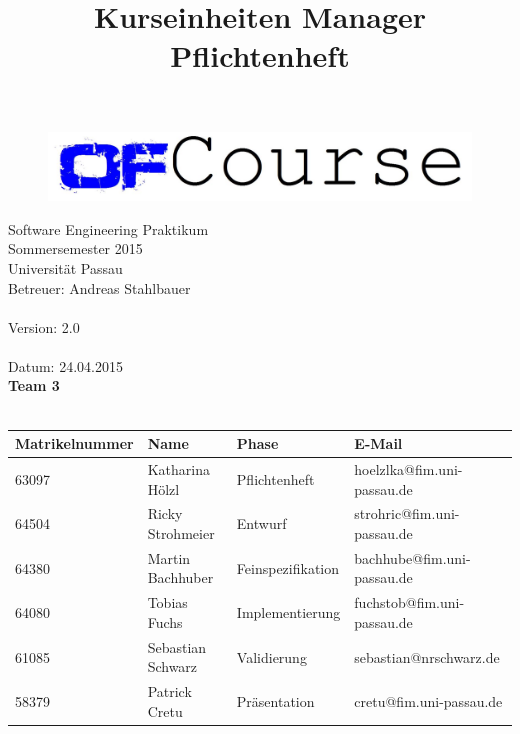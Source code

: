 \documentclass[a4paper]{scrreprt}
\begin{document}
	\thispagestyle{plain}

\begin{titlepage}
    \begin{center}
\begin{figure}[th]
\centering
\includegraphics[width=0.6\linewidth]{logo/name_blau_ofCourse.jpg}
\end{figure}

    	\begin{title}
        	\title{\Huge{\textbf{Kurseinheiten Manager \\ Pflichtenheft\\}}}

		\end{title}
		\hspace{3cm}

        	Software Engineering Praktikum \\
        	Sommersemester 2015\\
        	Universität Passau\\


        	Betreuer: Andreas Stahlbauer\\
        	\hspace{1,5cm}\\
        	Version: 2.0 \\
        	\hspace{1,5cm}\\
        	Datum: 24.04.2015\\[50pt]
        	\textbf{Team 3} \\
            \ \\
    
        
        
        \begin{tabular}{ | l | l | l | l |}
            \hline
            \textbf{Matrikelnummer} & \textbf{Name} & \textbf{Phase} & \textbf{E-Mail}  \\ \hline
            63097 & Katharina Hölzl & Pflichtenheft & hoelzlka@fim.uni-passau.de \\ \hline
            64504 & Ricky Strohmeier& Entwurf & strohric@fim.uni-passau.de  \\ \hline
            64380 & Martin Bachhuber & Feinspezifikation  & bachhube@fim.uni-passau.de \\ \hline
            64080 & Tobias Fuchs & Implementierung  &  fuchstob@fim.uni-passau.de\\ \hline
            61085 & Sebastian Schwarz & Validierung & sebastian@nrschwarz.de \\ \hline  
            58379 & Patrick Cretu  &  Präsentation & cretu@fim.uni-passau.de \\ \hline
        \end{tabular}
        

\end{center}
\end{titlepage}
\end{document}
